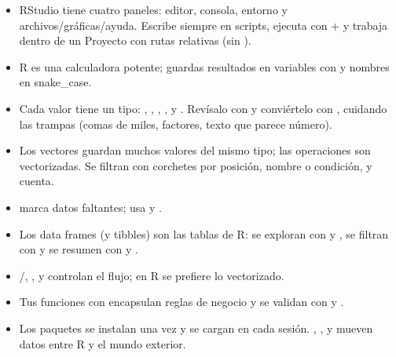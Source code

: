 \begin{resumen}
\begin{itemize}
  \item RStudio tiene cuatro paneles: editor, consola, entorno y
        archivos/gráficas/ayuda. Escribe siempre en scripts, ejecuta con
         +  y trabaja dentro de un Proyecto con
        rutas relativas (sin ).
  \item R es una calculadora potente; guardas resultados en variables con
        \codigo{<-} y nombres en snake\_case.
  \item Cada valor tiene un tipo: , ,
        , ,  y
        . Revísalo con  y conviértelo con
        , cuidando las trampas (comas de miles, factores,
        texto que parece número).
  \item Los vectores guardan muchos valores del mismo tipo; las operaciones
        son vectorizadas. Se filtran con corchetes por posición, nombre o
        condición, y  cuenta.
  \item {} marca datos faltantes; usa  y
        .
  \item Los data frames (y tibbles) son las tablas de R: se exploran con
         y , se filtran con
         y se resumen con  y
        .
  \item {}/, ,  y
         controlan el flujo; en R se prefiere lo vectorizado.
  \item Tus funciones con  encapsulan reglas de negocio
        y se validan con  y .
  \item Los paquetes se instalan una vez y se cargan en cada sesión.
        , ,
         y  mueven datos entre R y
        el mundo exterior.
\end{itemize}
\end{resumen}

